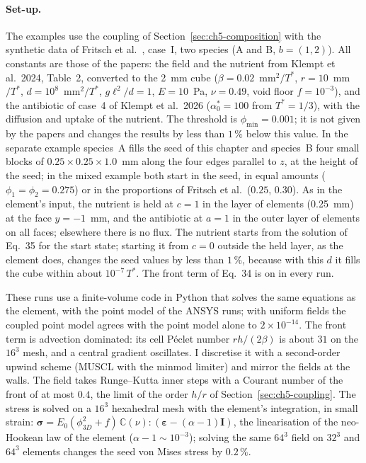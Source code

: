 \paragraph{Set-up.} The examples use the coupling of Section~\ref{sec:ch5-composition} with the
synthetic data of Fritsch et al.~\cite{Fritsch2025BayesianMicrofilms}, case~I, two species (A and B,
$b=(1,2)$). All constants are those of the papers: the field and the nutrient from Klempt et al.\ 2024,
Table~2, converted to the 2~mm cube ($\beta=0.02$~mm$^2/T^*$, $r=10$~mm$/T^*$, $d=10^8$~mm$^2/T^*$,
$g\ell^2/d=1$, $E=10$~Pa, $\nu=0.49$, void floor $f=10^{-3}$), and the antibiotic of case~4 of Klempt et
al.\ 2026 ($\alpha^*_0=100$ from $T^*=1/3$), with the diffusion and uptake of the nutrient. The
threshold is $\phi_{\min}=0.001$; it is not given by the papers and changes the results by less than
$1\,\%$ below this value. In the separate example species~A fills the seed of this chapter and
species~B four small blocks of $0.25\times0.25\times1.0$~mm along the four edges parallel to $z$, at the height of the
seed; in the mixed example both start in the seed,
in equal amounts ($\phi_1=\phi_2=0.275$) or in the proportions of Fritsch et al.\ ($0.25$, $0.30$). As in the
element's input, the nutrient is held at $c=1$ in the layer of elements (0.25~mm) at the face $y=-1$~mm, and the
antibiotic at $a=1$ in the outer layer of elements on all faces; elsewhere there is no flux. The nutrient starts from the solution
of Eq.~35 for the start state; starting it from $c=0$ outside the held layer, as the element does, changes the
seed values by less than $1\,\%$, because with this $d$ it fills the cube within about $10^{-7}\,T^*$. The front term \fterm{} of Eq.~34 is
on in every run.

These runs use a finite-volume code in Python that solves the same equations as the element, with the
point model of the ANSYS runs; with uniform fields the coupled point model agrees with the point model
alone to $2\times10^{-14}$. The front term \fterm{} is advection dominated: its cell P\'eclet
number $r h/(2\beta)$ is about $31$ on the $16^3$ mesh, and a central gradient oscillates. I discretise
it with a second-order upwind scheme (MUSCL with the minmod limiter) and mirror the fields at the walls.
The field takes Runge--Kutta inner steps with a Courant number of the front of at most $0.4$, the limit of the
order $h/r$ of Section~\ref{sec:ch5-coupling}.
The stress is solved on a $16^3$ hexahedral mesh with the element's integration, in small strain: $\boldsymbol\sigma=E_0(\phi_{3D}^2+f)\,\mathbb C(\nu):(\boldsymbol\varepsilon-(\alpha-1)\mathbf I)$, the linearisation of the neo-Hookean law of the element ($\alpha-1\sim10^{-3}$); solving the same
$64^3$ field on $32^3$ and $64^3$ elements changes the seed von Mises stress by $0.2\,\%$.

